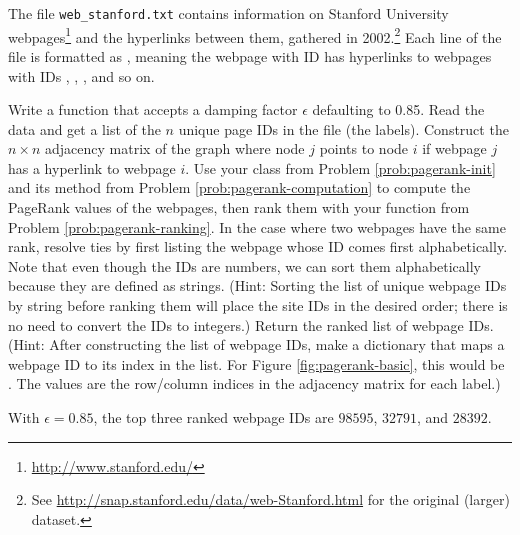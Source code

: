 \begin{comment}
Looking at Figure \ref{fig:pagerank-nosinks}, it is easy to see why a has the lowest PageRank value: the only other node that points to it is b.
It also makes sense that c has the highest ranking, since c and d both have edges from the other three nodes pointing to them, but d only has one edge (pointing to c), while c points to both b and d.
In other words, at each step d distributes all of its importance to c, while c splits its importance between b and d.

Of course, constructing rankings is much more difficult to do by hand when there are more than just a few nodes in the graph.
\end{comment}

\begin{problem} %
The file \texttt{web\_stanford.txt} contains information on Stanford University webpages\footnote{\url{http://www.stanford.edu/}} and the hyperlinks between them, gathered in 2002.\footnote{See \url{http://snap.stanford.edu/data/web-Stanford.html} for the original (larger) dataset.}
Each line of the file is formatted as , meaning the webpage with ID  has hyperlinks to webpages with IDs , , , and so on.

Write a function that accepts a damping factor $\epsilon$ defaulting to 0.85.
Read the data and get a list of the $n$ unique page IDs in the file (the labels).
Construct the $n\times n$ adjacency matrix of the graph where node $j$ points to node $i$ if webpage $j$ has a hyperlink to webpage $i$.
Use your class from Problem \ref{prob:pagerank-init} and its  method from Problem \ref{prob:pagerank-computation} to compute the PageRank values of the webpages, then rank them with your function from Problem \ref{prob:pagerank-ranking}. 
In the case where two webpages have the same rank, resolve ties by first listing the webpage whose ID comes first alphabetically. Note that even though the IDs are numbers, we can sort them alphabetically because they are defined as strings.
(Hint: Sorting the list of unique webpage IDs by string before ranking them will place the site IDs in the desired order; there is no need to convert the IDs to integers.) 
Return the ranked list of webpage IDs.
\\(Hint: After constructing the list of webpage IDs, make a dictionary that maps a webpage ID to its index in the list.
For Figure \ref{fig:pagerank-basic}, this would be .
The values are the row/column indices in the adjacency matrix for each label.)

With $\epsilon=0.85$, the top three ranked webpage IDs are $98595$, $32791$, and $28392$.
\end{problem}

